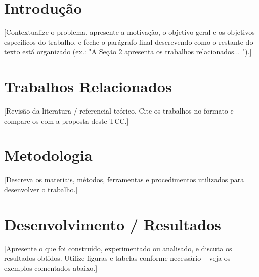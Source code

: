 \documentclass[a4paper,12pt]{article}
\begin{document}
\vspace{18pt}


\section{Introdução}

[Contextualize o problema, apresente a motivação, o objetivo geral e
os objetivos específicos do trabalho, e feche o parágrafo final
descrevendo como o restante do texto está organizado
(ex.: "A Seção 2 apresenta os trabalhos relacionados... ").]

\section{Trabalhos Relacionados}

[Revisão da literatura / referencial teórico. Cite os trabalhos no
formato \cite{exemplo2024} e compare-os com a proposta deste TCC.]

\section{Metodologia}

[Descreva os materiais, métodos, ferramentas e procedimentos
utilizados para desenvolver o trabalho.]

\section{Desenvolvimento / Resultados}

[Apresente o que foi construído, experimentado ou analisado, e
discuta os resultados obtidos. Utilize figuras e tabelas conforme
necessário -- veja os exemplos comentados abaixo.]


\end{document}
